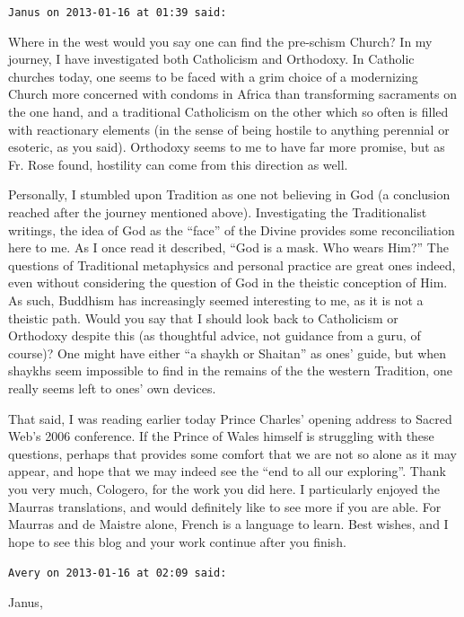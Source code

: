 \begin{footnotesize}
\begin{sffamily}
\texttt{Janus on 2013-01-16 at 01:39 said:}

Where in the west would you say one can find the pre-schism Church? In my journey, I have investigated both Catholicism and Orthodoxy. In Catholic churches today, one seems to be faced with a grim choice of a modernizing Church more concerned with condoms in Africa than transforming sacraments on the one hand, and a traditional Catholicism on the other which so often is filled with reactionary elements (in the sense of being hostile to anything perennial or esoteric, as you said). Orthodoxy seems to me to have far more promise, but as Fr. Rose found, hostility can come from this direction as well.

Personally, I stumbled upon Tradition as one not believing in God (a conclusion reached after the journey mentioned above). Investigating the Traditionalist writings, the idea of God as the ``face'' of the Divine provides some reconciliation here to me. As I once read it described, ``God is a mask. Who wears Him?'' The questions of Traditional metaphysics and personal practice are great ones indeed, even without considering the question of God in the theistic conception of Him. As such, Buddhism has increasingly seemed interesting to me, as it is not a theistic path. Would you say that I should look back to Catholicism or Orthodoxy despite this (as thoughtful advice, not guidance from a guru, of course)? One might have either ``a shaykh or Shaitan'' as ones' guide, but when shaykhs seem impossible to find in the remains of the the western Tradition, one really seems left to ones' own devices.

That said, I was reading earlier today Prince Charles' opening address to Sacred Web's 2006 conference. If the Prince of Wales himself is struggling with these questions, perhaps that provides some comfort that we are not so alone as it may appear, and hope that we may indeed see the ``end to all our exploring''. Thank you very much, Cologero, for the work you did here. I particularly enjoyed the Maurras translations, and would definitely like to see more if you are able. For Maurras and de Maistre alone, French is a language to learn. Best wishes, and I hope to see this blog and your work continue after you finish.

\hfill

\texttt{Avery on 2013-01-16 at 02:09 said:}

Janus,


\end{sffamily}
\end{footnotesize}
